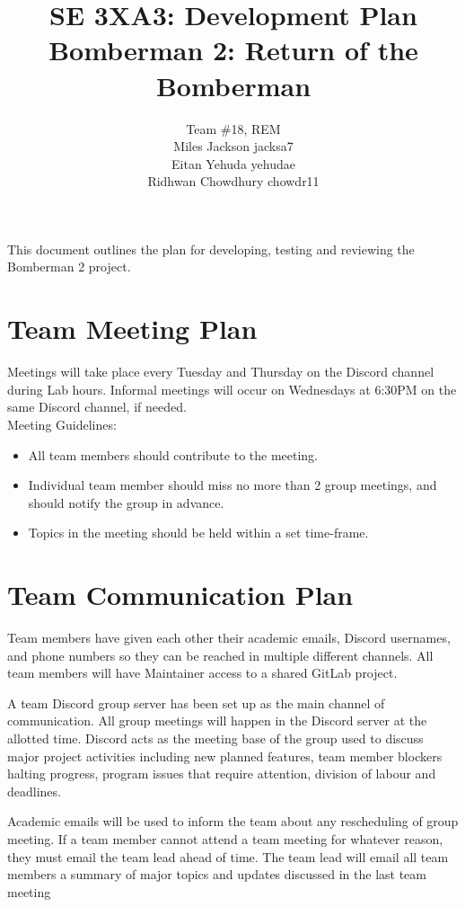 \documentclass{article}
\title{SE 3XA3: Development Plan\\Bomberman 2: Return of the Bomberman}
\author{Team \#18, REM
		\\ Miles Jackson  jacksa7
		\\ Eitan Yehuda  yehudae
		\\ Ridhwan Chowdhury chowdr11
}
\date{}
\begin{document}
\maketitle

This document outlines the plan for developing, testing and reviewing the Bomberman 2
project.

\section{Team Meeting Plan}

Meetings will take place every Tuesday and Thursday on the Discord channel during Lab hours.
Informal meetings will occur on Wednesdays at 6:30PM on the same Discord channel, if needed. \\
\linebreak 
Meeting Guidelines:
\begin{itemize}
    \item All team members should contribute to the meeting.
    \item Individual team member should miss no more than 2 group meetings, and should notify the group in advance.
    \item Topics in the meeting should be held within a set time-frame.

\end{itemize}


\section{Team Communication Plan}

Team members have given each other their academic emails, Discord usernames, and phone numbers so they can be reached in multiple different channels. All team members will have Maintainer access to a shared GitLab project.

A team Discord group server has been set up as the main channel of communication. All group meetings will happen in the Discord server at the allotted time. Discord acts as the meeting base of the group used to discuss major project activities including new planned features, team member blockers halting progress, program issues that require attention, division of labour and deadlines.

Academic emails will be used to inform the team about any rescheduling of group meeting. If a team member cannot attend a team meeting for whatever reason, they must email the team lead ahead of time. The team lead will email all team members a summary of major topics and updates discussed in the last team meeting
\end{document}
